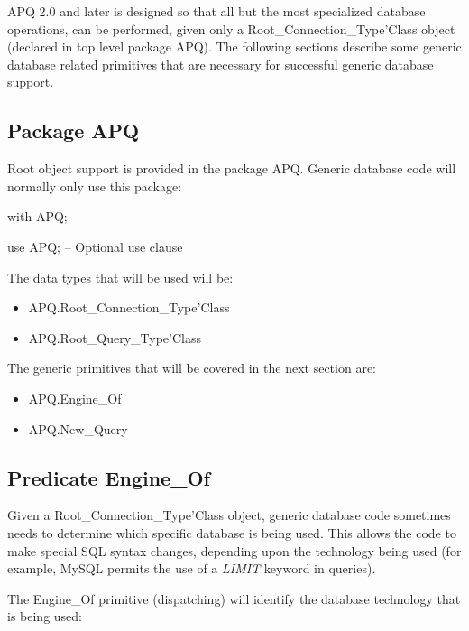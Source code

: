 \documentclass[english,letterpaper]{book}
\begin{document}
APQ 2.0 and later is designed so that all but the most specialized
database operations, can be performed, given only a Root\_Connection\_Type'Class
object (declared in top level package APQ). The following sections
describe some generic database related primitives that are necessary
for successful generic database support.


\subsection{Package APQ}

Root object support is provided in the package APQ. Generic database
code will normally only use this package:

\begin{Code}
   with APQ;

   use APQ;  -- Optional use clause
\end{Code}

The data types that will be used will be:

\begin{itemize}
   \item APQ.Root\_Connection\_Type'Class
   \item APQ.Root\_Query\_Type'Class
\end{itemize}

The generic primitives that will be covered in the next section are:

\begin{itemize}
   \item APQ.Engine\_Of
   \item APQ.New\_Query
\end{itemize}

\subsection{Predicate Engine\_Of\label{Generic Database Engine_Of}}

Given a Root\_Connection\_Type'Class object, generic database code
sometimes needs to determine which specific database is being used.
This allows the code to make special SQL syntax changes, depending
upon the technology being used (for example, MySQL permits the use
of a \emph{LIMIT} keyword in queries).

The Engine\_Of primitive (dispatching) will identify the
database technology that is being used:
\end{document}
